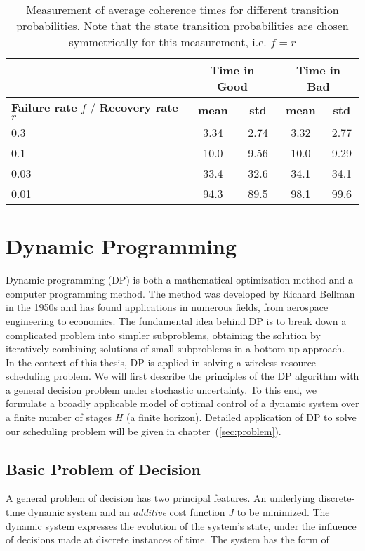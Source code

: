 \begin{table}[h]
  \begin{center}
  \begin{tabular}{|p{3.5cm}|c|c|c|c|}
  \hline 
  & \multicolumn{2}{|c|}{\textbf{Time in Good}} &
  \multicolumn{2}{|c|}{\textbf{Time in Bad}} \\
  \hline
  \textbf{Failure rate} $f$ / \textbf{Recovery rate} $r$ & \textbf{mean} & \textbf{std} & \textbf{mean}
  & \textbf{std}\\
  \hline \hline
  0.3 & 3.34 & 2.74 & 3.32 & 2.77 \\
  \hline 
  0.1 & 10.0 & 9.56 & 10.0 & 9.29 \\
  \hline 
  0.03 & 33.4 & 32.6 & 34.1 & 34.1 \\
  \hline 
  0.01 & 94.3 & 89.5 & 98.1 & 99.6 \\
  \hline 
  \end{tabular}
  \caption[Measurement of average coherence time]{Measurement of average
  coherence times for different transition probabilities. Note that the state
  transition probabilities are chosen symmetrically for this measurement, i.e.
  $f=r$}
  \label{tab:sojournTime}
  \end{center}
  \end{table}


\section{Dynamic Programming} \label{sec:DP}

Dynamic programming (DP) is both a mathematical optimization method and a
computer programming method. The method was developed by Richard Bellman in the
1950s and has found applications in numerous fields, from aerospace engineering
to economics. The fundamental idea behind DP is to break down a complicated
problem into simpler subproblems, obtaining the solution by iteratively
combining solutions of small subproblems in a bottom-up-approach. \\ In the
context of this thesis, DP is applied in solving a wireless resource scheduling
problem. We will first describe the principles of the DP algorithm with a
general decision problem under stochastic uncertainty. To this end, we formulate
a broadly applicable model of optimal control of a dynamic system over a finite
number of stages $H$ (a finite horizon). Detailed application of DP to solve our
scheduling problem will be given in chapter~(\ref{sec:problem}).

\subsection*{Basic Problem of Decision}
A general problem of decision has two principal features. An underlying
discrete-time dynamic system and an \textit{additive} cost function $J$ to be
minimized. The dynamic system expresses the evolution of the system's state,
under the influence of decisions made at discrete instances of time. The system
has the form of

